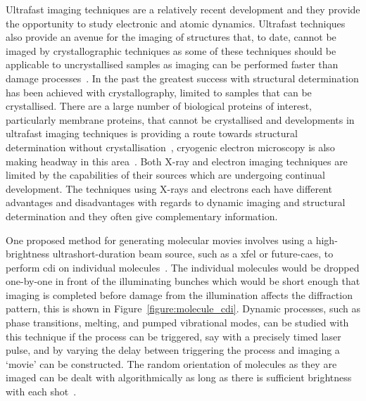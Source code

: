 Ultrafast imaging techniques are a relatively recent development and they provide the opportunity to study electronic and atomic dynamics.
Ultrafast techniques also provide an avenue for the imaging of structures that, to date, cannot be imaged by crystallographic techniques as some of these techniques should be applicable to uncrystallised samples as imaging can be performed faster than damage processes~\cite{gaffney_imaging_2007,barty_ultrafast_2008,miao_beyond_2015}.
In the past the greatest success with structural determination has been achieved with crystallography, limited to samples that can be crystallised.
There are a large number of biological proteins of interest, particularly membrane proteins, that cannot be crystallised and developments in ultrafast imaging techniques is providing a route towards structural determination without crystallisation~\cite{dauter_current_2006,levitt_nature_2009}, cryogenic electron microscopy is also making headway in this area~\cite{henderson_model_1990,zhou_towards_2008}.
Both X-ray and electron imaging techniques are limited by the capabilities of their sources which are undergoing continual development.
The techniques using X-rays and electrons each have different advantages and disadvantages with regards to dynamic imaging and structural determination and they often give complementary information.

One proposed method for generating molecular movies involves using a high-brightness ultrashort-duration beam source, such as a \gls{xfel} or future-\gls{caes}, to perform \gls{cdi} on individual molecules~\cite{chapman_femtosecond_2006,dwyer_femtosecond_2006,gaffney_imaging_2007}.
The individual molecules would be dropped one-by-one in front of the illuminating bunches which would be short enough that imaging is completed before damage from the illumination affects the diffraction pattern, this is shown in Figure~\ref{figure:molecule_cdi}.
Dynamic processes, such as phase transitions, melting, and pumped vibrational modes, can be studied with this technique if the process can be triggered, say with a precisely timed laser pulse, and by varying the delay between triggering the process and imaging a `movie' can be constructed.
The random orientation of molecules as they are imaged can be dealt with algorithmically as long as there is sufficient brightness with each shot~\cite{yefanov_orientation_2013}.

